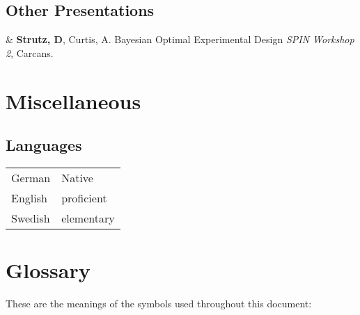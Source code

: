 \documentclass[10pt, a4paper]{article}
\newcommand{\LastName}{Strutz}
\newcommand{\Initials}{D}
\newcommand{\Me}{\textbf{\LastName, \Initials}}  %
\newcommand{\AC}{Curtis, A}
\newcommand{\TablePad}{\vspace{-0.4cm}}
\newcommand{\Youtube}[1]{\href{https://www.youtube.com/watch?v=#1}{\faYoutube}}
\newcommand{\Year}[1]{\fontsize{9pt}{0}\selectfont #1}
\begin{document}
\subsection{Other Presentations}

\begin{EntriesTableExtra}
\Year{2021}  &
  \Me, \AC.
  Bayesian Optimal Experimental Design
  \emph{SPIN Workshop 2},
  Carcans.
  \Youtube{fViIGwYm2gs}
  \\
\end{EntriesTableExtra}

\section{Miscellaneous}


\subsection{Languages}

\TablePad
\begin{tabularx}{\textwidth}{@{}p{} p{}@{}}
  German & Native
  \\
  English & proficient
  \\
  Swedish & elementary
\end{tabularx}

\section{Glossary}

These are the meanings of the symbols used throughout this document:
\\
\TablePad
\end{document}
